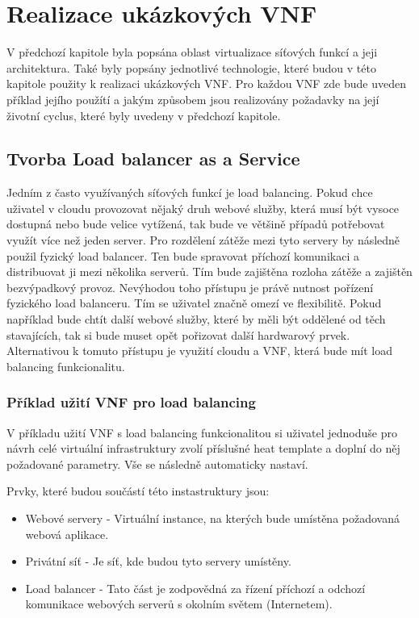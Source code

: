 \chapter{Realizace ukázkových VNF}

V předchozí kapitole byla popsána oblast virtualizace síťových funkcí a jeji architektura. Také byly popsány jednotlivé technologie, které budou v této kapitole použity k realizaci ukázkových VNF. Pro každou VNF zde bude uveden příklad jejího použítí a jakým způsobem jsou realizovány požadavky na její životní cyclus, které byly uvedeny v předchozí kapitole. 

\section{Tvorba Load balancer as a Service}

Jedním z často využívaných síťových funkcí je load balancing. Pokud chce uživatel v cloudu provozovat nějaký druh webové služby, která musí být vysoce dostupná nebo bude velice vytížená, tak bude ve většině případů potřebovat využít více než jeden server. Pro rozdělení zátěže mezi tyto servery by následně použil fyzický load balancer. Ten bude spravovat příchozí komunikaci a distribuovat ji mezi několika serverů. Tím bude zajištěna rozloha zátěže a zajištěn bezvýpadkový provoz. Nevýhodou toho přístupu je právě nutnost pořízení fyzického load balanceru. Tím se uživatel značně omezí ve flexibilitě. Pokud například bude chtít další webové služby, které by měli být oddělené od těch stavajících, tak si bude muset opět pořizovat další hardwarový prvek. Alternativou k tomuto přístupu je využití cloudu a VNF, která bude mít load balancing funkcionalitu.


\subsection{Příklad užití VNF pro load balancing}

V příkladu užití VNF s load balancing funkcionalitou si uživatel jednoduše pro návrh celé virtuální infrastruktury zvolí příslušné heat template a doplní do něj požadované parametry. Vše se následně automaticky nastaví. 

Prvky, které budou součástí této instastruktury jsou:

\begin{itemize}
\item Webové servery - Virtuální instance, na kterých bude umístěna požadovaná webová aplikace.
\item Privátní síť - Je síť, kde budou tyto servery umístěny.
\item Load balancer - Tato část je zodpovědná za řízení příchozí a odchozí komunikace webových serverů s okolním světem (Internetem).
\end{itemize}

